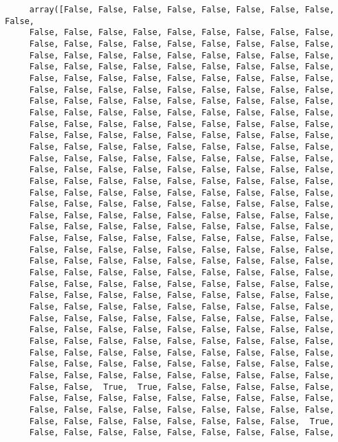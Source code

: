 \documentclass[letterpaper]{article}
\begin{document}
\begin{minipage}{\linewidth}
	\begin{Verbatim}
     array([False, False, False, False, False, False, False, False, False,
     False, False, False, False, False, False, False, False, False,
     False, False, False, False, False, False, False, False, False,
     False, False, False, False, False, False, False, False, False,
     False, False, False, False, False, False, False, False, False,
     False, False, False, False, False, False, False, False, False,
     False, False, False, False, False, False, False, False, False,
     False, False, False, False, False, False, False, False, False,
     False, False, False, False, False, False, False, False, False,
     False, False, False, False, False, False, False, False, False,
     False, False, False, False, False, False, False, False, False,
     False, False, False, False, False, False, False, False, False,
     False, False, False, False, False, False, False, False, False,
     False, False, False, False, False, False, False, False, False,
     False, False, False, False, False, False, False, False, False,
     False, False, False, False, False, False, False, False, False,
     False, False, False, False, False, False, False, False, False,
     False, False, False, False, False, False, False, False, False,
     False, False, False, False, False, False, False, False, False,
     False, False, False, False, False, False, False, False, False,
     False, False, False, False, False, False, False, False, False,
     False, False, False, False, False, False, False, False, False,
     False, False, False, False, False, False, False, False, False,
     False, False, False, False, False, False, False, False, False,
     False, False, False, False, False, False, False, False, False,
     False, False, False, False, False, False, False, False, False,
     False, False, False, False, False, False, False, False, False,
     False, False, False, False, False, False, False, False, False,
     False, False, False, False, False, False, False, False, False,
     False, False, False, False, False, False, False, False, False,
     False, False, False, False, False, False, False, False, False,
     False, False, False, False, False, False, False, False, False,
     False, False,  True,  True, False, False, False, False, False,
     False, False, False, False, False, False, False, False, False,
     False, False, False, False, False, False, False, False, False,
     False, False, False, False, False, False, False, False,  True,
     False, False, False, False, False, False, False, False, False,

\end{Verbatim}
\end{minipage}
\end{document}
